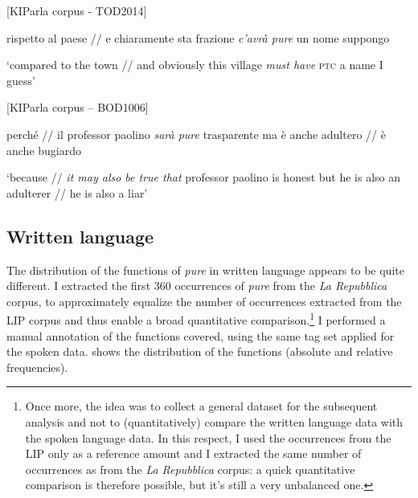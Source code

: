 \ea%
    \label{ex:key:36}

          [KIParla corpus - TOD2014]

rispetto al paese // e chiaramente sta frazione \textit{c’avrà pure} un nome suppongo

\glt ‘compared to the town // and obviously this village \textit{must have} \textsc{ptc} a name I guess’
    \z

\ea%
    \label{ex:key:37}

          [KIParla corpus – BOD1006]

perché // il professor paolino \textit{sarà pure} trasparente ma è anche adultero // è anche bugiardo

\glt ‘because // \textit{it may also be true that} professor paolino is honest but he is also an adulterer // he is also a liar’
    \z

\subsection{Written language}
\hypertarget{Toc124860654}{}
The distribution of the functions of \textit{pure} in written language appears to be quite different. I extracted the first 360 occurrences of \textit{pure} from the \textit{La Repubblica} corpus, to approximately equalize the number of occurrences extracted from the LIP corpus and thus enable a broad quantitative comparison.\footnote{Once more, the idea was to collect a general dataset for the subsequent analysis and not to (quantitatively) compare the written language data with the spoken language data. In this respect, I used the occurrences from the LIP only as a reference amount and I extracted the same number of occurrences as from the \textit{La Repubblica} corpus: a quick quantitative comparison is therefore possible, but it’s still a very unbalanced one.} I performed a manual annotation of the functions covered, using the same tag set applied for the spoken data.  shows the distribution of the functions (absolute and relative frequencies).

